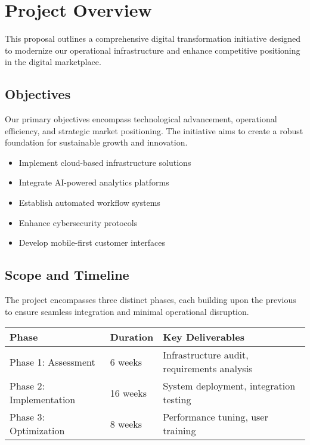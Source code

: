 \documentclass[11pt,a4paper]{article}
\begin{document}

\templateOneTable

\section{Project Overview}

\color{primary}
This proposal outlines a comprehensive digital transformation initiative designed to modernize our operational infrastructure and enhance competitive positioning in the digital marketplace.

\subsection{Objectives}

Our primary objectives encompass technological advancement, operational efficiency, and strategic market positioning. The initiative aims to create a robust foundation for sustainable growth and innovation.

\begin{itemize}
  \item Implement cloud-based infrastructure solutions
  \item Integrate AI-powered analytics platforms
  \item Establish automated workflow systems
  \item Enhance cybersecurity protocols
  \item Develop mobile-first customer interfaces
\end{itemize}

\subsection{Scope and Timeline}

The project encompasses three distinct phases, each building upon the previous to ensure seamless integration and minimal operational disruption.

\begin{center}
\begin{tabularx}{\textwidth}{|X|X|X|}
\hline
\rowcolor{lightgray}
\textbf{Phase} & \textbf{Duration} & \textbf{Key Deliverables} \\
\hline
Phase 1: Assessment & 6 weeks & Infrastructure audit, requirements analysis \\
\hline
Phase 2: Implementation & 16 weeks & System deployment, integration testing \\
\hline
Phase 3: Optimization & 8 weeks & Performance tuning, user training \\
\hline
\end{tabularx}
\end{center}
\end{document}
